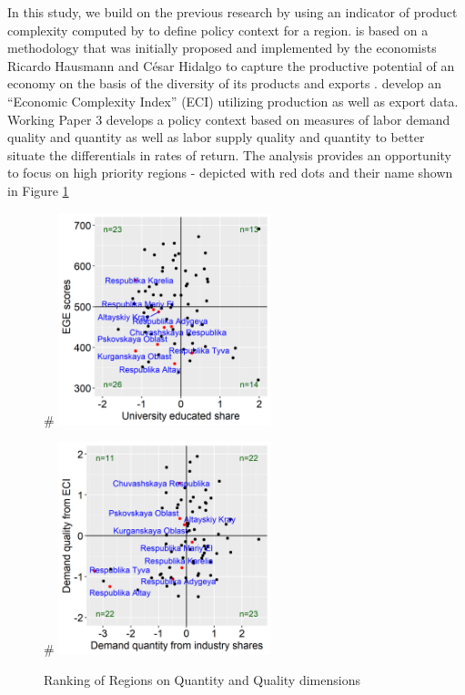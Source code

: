 \documentclass[alpha-refs]{wiley-article-04t}
\begin{document}
In this study, we build on the previous research by using an indicator of 
product complexity computed by \cite{lyubimov2018} to define policy context 
for a region. \cite{lyubimov2018} is based on 
a methodology that was initially proposed and implemented by the economists 
Ricardo Hausmann and C\'esar Hidalgo to capture the productive potential 
of an economy on the basis of the diversity of its products and exports 
\parencite{hausmann2011, hausmann2014}. \cite{lyubimov2018} develop an 
``Economic Complexity Index'' (ECI) utilizing production as well as export 
data. Working Paper 3 develops a policy context based on measures of labor 
demand quality and quantity as well as labor supply quality and quantity to 
better situate the differentials in rates of return. The analysis provides 
an opportunity to focus on high priority regions - depicted with red dots 
and their name shown in Figure \ref{fig:4.2}

\setcounter{table}{0}


\begin{figure}[htbp!]
	\begin{minipage}[b]{.5\linewidth}
		\centering
		#\hspace*{-0.2in}
		\includegraphics[width=175pt]{ranks1a.png}
	\end{minipage}
	\hfill
	\begin{minipage}[b]{.5\linewidth}
		\centering
		#\hspace*{-0.2in}
		\includegraphics[width=175pt]{ranks1b.png}
	\end{minipage}
	\caption{Ranking of Regions on Quantity and Quality 
	dimensions}\label{fig:4.2}
\end{figure}
\end{document}
